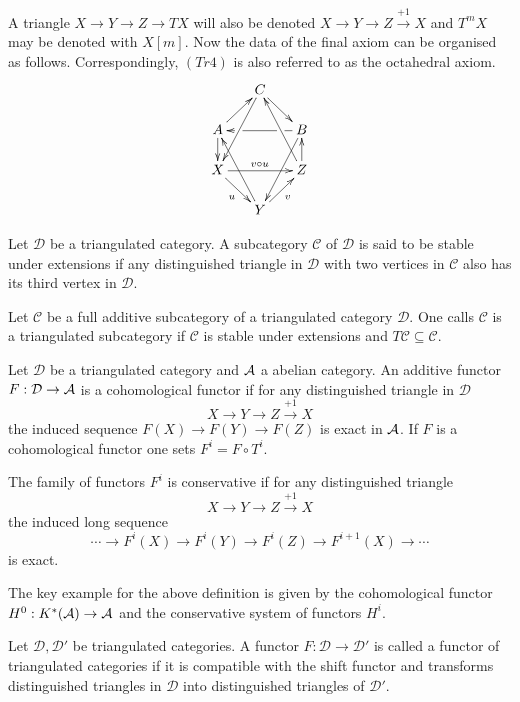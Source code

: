 A triangle $X\to Y \to Z \to TX$ will also be denoted $X\to Y \to Z \xrightarrow{+1} X$ and $T^m X$ may be denoted with $X[m]$.
Now the data of the final axiom can be organised as follows.
Correspondingly, $(Tr4)$ is also referred to as the octahedral axiom.
\begin{equation*}
\xymatrix@=1.6em{
& C \ar@{->}[dr] \ar[ddl] & \\
A \ar@{->}[ur] \ar[d]& &
   B\ar[ll]|(0.25)\hole|(0.75)\hole
      \ar[ddl] \\
X \ar[rr]^{v \circ u} \ar[dr]_u & &
   Z \ar[u] \ar[uul]\\
& Y \ar[ur]_v \ar[uul]&
}
\end{equation*}
\begin{definition}
 Let $\mathcal{D}$ be a triangulated category. A subcategory $\mathcal{C}$ of $\mathcal{D}$ is said to be stable under extensions if any distinguished triangle in $\mathcal{D}$ with two vertices in $\mathcal{C}$ also has its third vertex in $\mathcal{D}$.
\end{definition}
\begin{definition}
 Let $\mathcal{C}$ be a full additive subcategory of a triangulated category $\mathcal{D}$. One calls $\mathcal{C}$ is a triangulated subcategory if $\mathcal{C}$ is stable under extensions and $T\mathcal{C}\subseteq \mathcal{C}$.
\end{definition}

\begin{definition}
 Let $\mathcal{D}$ be a triangulated category and $\AA$ a abelian category.
 An additive functor $F:\mathcal{D} \to \AA$ is a cohomological functor if for any distinguished triangle in $\mathcal{D}$
 $$X \to Y \to Z\xrightarrow{+1} X $$
 the induced sequence $F(X) \to F(Y) \to F(Z) $
 is exact in $\AA$. If $F$ is a cohomological functor one sets $F^i = F\circ T^i$.

 The family of functors $F^i$ is conservative if for any distinguished triangle
 $$X \to Y \to Z \xrightarrow{+1} X$$
 the induced long sequence
 $$\cdots \to F^i(X) \to F^i(Y) \to F^i(Z) \to F^{i+1}(X) \to \cdots $$
 is exact.
\end{definition}
The key example for the above definition is given by the cohomological functor $H^0: K^*(\AA) \to \AA$ and the conservative system of functors $H^i$.
\begin{definition}
 Let $\mathcal{D}, \mathcal{D}'$ be triangulated categories.
 A functor $F:\mathcal{D} \to \mathcal{D}'$ is called a functor of triangulated categories if it is compatible with the shift functor and transforms distinguished triangles in $\mathcal{D}$ into distinguished triangles of $\mathcal{D}'$.
\end{definition}

